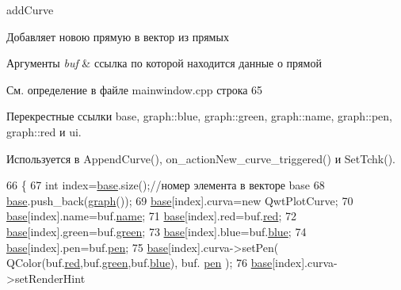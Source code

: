 add\+Curve 

Добавляет новою прямую в вектор из прямых 
\begin{DoxyParams}{Аргументы}
{\em buf} & ссылка по которой находится данные о прямой \\
\hline
\end{DoxyParams}


См. определение в файле mainwindow.\+cpp строка 65



Перекрестные ссылки base, graph\+::blue, graph\+::green, graph\+::name, graph\+::pen, graph\+::red и ui.



Используется в Append\+Curve(), on\+\_\+action\+New\+\_\+curve\+\_\+triggered() и Set\+Tchk().


\begin{DoxyCode}
66 \{
67     \textcolor{keywordtype}{int} index=\hyperlink{class_main_window_a3413d4508f4981518b1b8ebf3b29121e}{base}.size();\textcolor{comment}{//номер элемента в векторе base}
68     \hyperlink{class_main_window_a3413d4508f4981518b1b8ebf3b29121e}{base}.push\_back(\hyperlink{classgraph_a6aaa56b4528d2fdb8f0ecd97e04f6651}{graph}());
69     \hyperlink{class_main_window_a3413d4508f4981518b1b8ebf3b29121e}{base}[index].curva=\textcolor{keyword}{new} QwtPlotCurve;
70     \hyperlink{class_main_window_a3413d4508f4981518b1b8ebf3b29121e}{base}[index].name=buf.\hyperlink{classgraph_abfbbdbd09b20d6ef147ee966b1325595}{name};
71     \hyperlink{class_main_window_a3413d4508f4981518b1b8ebf3b29121e}{base}[index].red=buf.\hyperlink{classgraph_aa3334acd551b2fc61901c2afdd4b2d8f}{red};
72     \hyperlink{class_main_window_a3413d4508f4981518b1b8ebf3b29121e}{base}[index].green=buf.\hyperlink{classgraph_abb30b4156f98b6e0046f7192c389e4e4}{green};
73     \hyperlink{class_main_window_a3413d4508f4981518b1b8ebf3b29121e}{base}[index].blue=buf.\hyperlink{classgraph_a2007891f138555cc8be9ca822b9fa2db}{blue};
74     \hyperlink{class_main_window_a3413d4508f4981518b1b8ebf3b29121e}{base}[index].pen=buf.\hyperlink{classgraph_a237fa656ed0f8909b8eadd22aaeff422}{pen};
75     \hyperlink{class_main_window_a3413d4508f4981518b1b8ebf3b29121e}{base}[index].curva->setPen( QColor(buf.\hyperlink{classgraph_aa3334acd551b2fc61901c2afdd4b2d8f}{red},buf.\hyperlink{classgraph_abb30b4156f98b6e0046f7192c389e4e4}{green},buf.\hyperlink{classgraph_a2007891f138555cc8be9ca822b9fa2db}{blue}), buf.
      \hyperlink{classgraph_a237fa656ed0f8909b8eadd22aaeff422}{pen} );
76     \hyperlink{class_main_window_a3413d4508f4981518b1b8ebf3b29121e}{base}[index].curva->setRenderHint

\end{DoxyCode}
